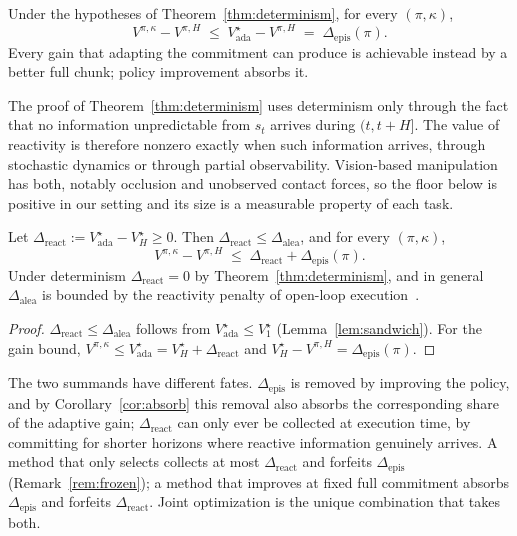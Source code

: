\begin{corollary}[Absorption]
\label{cor:absorb}
Under the hypotheses of Theorem~\ref{thm:determinism}, for every $(\pi,\kappa)$,
\[
V^{\pi,\kappa}-V^{\pi,H}\;\le\;V^{\star}_{\mathrm{ada}}-V^{\pi,H}\;=\;\Delta_{\mathrm{epis}}(\pi).
\]
Every gain that adapting the commitment can produce is achievable instead by a better full chunk;
policy improvement absorbs it.
\end{corollary}

\begin{remark}
\label{rem:reactive-info}
The proof of Theorem~\ref{thm:determinism} uses determinism only through the fact that no
information unpredictable from $s_t$ arrives during $(t,t+H]$. The value of reactivity is
therefore nonzero exactly when such information arrives, through stochastic dynamics or through
partial observability. Vision-based manipulation has both, notably occlusion and unobserved
contact forces, so the floor below is positive in our setting and its size is a measurable
property of each task.
\end{remark}

\begin{theorem}
\label{thm:floor}
Let $\Delta_{\mathrm{react}}:=V^{\star}_{\mathrm{ada}}-V^{\star}_{H}\ge0$. Then
$\Delta_{\mathrm{react}}\le\Delta_{\mathrm{alea}}$, and for every $(\pi,\kappa)$,
\[
V^{\pi,\kappa}-V^{\pi,H}\;\le\;\Delta_{\mathrm{react}}+\Delta_{\mathrm{epis}}(\pi).
\]
Under determinism $\Delta_{\mathrm{react}}=0$ by Theorem~\ref{thm:determinism}, and in general
$\Delta_{\mathrm{alea}}$ is bounded by the reactivity penalty of open-loop
execution~\citep[Cor.~1]{dqc}.
\end{theorem}
\begin{proof}
$\Delta_{\mathrm{react}}\le\Delta_{\mathrm{alea}}$ follows from
$V^{\star}_{\mathrm{ada}}\le V^{\star}_{1}$ (Lemma~\ref{lem:sandwich}). For the gain bound,
$V^{\pi,\kappa}\le V^{\star}_{\mathrm{ada}}=V^{\star}_{H}+\Delta_{\mathrm{react}}$ and
$V^{\star}_{H}-V^{\pi,H}=\Delta_{\mathrm{epis}}(\pi)$.
\end{proof}

The two summands have different fates. $\Delta_{\mathrm{epis}}$ is removed by improving the
policy, and by Corollary~\ref{cor:absorb} this removal also absorbs the corresponding share of the
adaptive gain; $\Delta_{\mathrm{react}}$ can only ever be collected at execution time, by
committing for shorter horizons where reactive information genuinely arrives. A method that only
selects collects at most $\Delta_{\mathrm{react}}$ and forfeits $\Delta_{\mathrm{epis}}$
(Remark~\ref{rem:frozen}); a method that improves at fixed full commitment absorbs
$\Delta_{\mathrm{epis}}$ and forfeits $\Delta_{\mathrm{react}}$. Joint optimization is the unique
combination that takes both.

